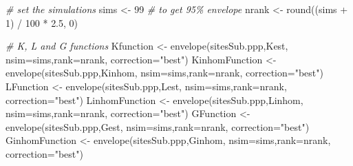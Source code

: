 \documentclass[
]{article}
\newenvironment{Shaded}{\begin{snugshade}}{\end{snugshade}}
\newcommand{\AttributeTok}[1]{\textcolor[rgb]{0.77,0.63,0.00}{#1}}
\newcommand{\CommentTok}[1]{\textcolor[rgb]{0.56,0.35,0.01}{\textit{#1}}}
\newcommand{\DecValTok}[1]{\textcolor[rgb]{0.00,0.00,0.81}{#1}}
\newcommand{\FloatTok}[1]{\textcolor[rgb]{0.00,0.00,0.81}{#1}}
\newcommand{\FunctionTok}[1]{\textcolor[rgb]{0.00,0.00,0.00}{#1}}
\newcommand{\NormalTok}[1]{#1}
\newcommand{\OtherTok}[1]{\textcolor[rgb]{0.56,0.35,0.01}{#1}}
\newcommand{\SpecialCharTok}[1]{\textcolor[rgb]{0.00,0.00,0.00}{#1}}
\newcommand{\StringTok}[1]{\textcolor[rgb]{0.31,0.60,0.02}{#1}}
\begin{document}
\begin{Shaded}
\begin{Highlighting}[]
\CommentTok{\# set the simulations}
\NormalTok{sims }\OtherTok{\textless{}{-}} \DecValTok{99}
\CommentTok{\# to get 95\% envelope}
\NormalTok{nrank }\OtherTok{\textless{}{-}} \FunctionTok{round}\NormalTok{((sims }\SpecialCharTok{+} \DecValTok{1}\NormalTok{) }\SpecialCharTok{/} \DecValTok{100} \SpecialCharTok{*} \FloatTok{2.5}\NormalTok{, }\DecValTok{0}\NormalTok{) }

\CommentTok{\# K, L and G functions }
\NormalTok{Kfunction }\OtherTok{\textless{}{-}} \FunctionTok{envelope}\NormalTok{(sitesSub.ppp,Kest, }\AttributeTok{nsim=}\NormalTok{sims,}\AttributeTok{rank=}\NormalTok{nrank, }\AttributeTok{correction=}\StringTok{"best"}\NormalTok{) }
\NormalTok{KinhomFunction }\OtherTok{\textless{}{-}} \FunctionTok{envelope}\NormalTok{(sitesSub.ppp,Kinhom, }\AttributeTok{nsim=}\NormalTok{sims,}\AttributeTok{rank=}\NormalTok{nrank, }\AttributeTok{correction=}\StringTok{"best"}\NormalTok{)}
\NormalTok{LFunction }\OtherTok{\textless{}{-}} \FunctionTok{envelope}\NormalTok{(sitesSub.ppp,Lest, }\AttributeTok{nsim=}\NormalTok{sims,}\AttributeTok{rank=}\NormalTok{nrank, }\AttributeTok{correction=}\StringTok{"best"}\NormalTok{)}
\NormalTok{LinhomFunction }\OtherTok{\textless{}{-}} \FunctionTok{envelope}\NormalTok{(sitesSub.ppp,Linhom, }\AttributeTok{nsim=}\NormalTok{sims,}\AttributeTok{rank=}\NormalTok{nrank, }\AttributeTok{correction=}\StringTok{"best"}\NormalTok{)}
\NormalTok{GFunction }\OtherTok{\textless{}{-}} \FunctionTok{envelope}\NormalTok{(sitesSub.ppp,Gest, }\AttributeTok{nsim=}\NormalTok{sims,}\AttributeTok{rank=}\NormalTok{nrank, }\AttributeTok{correction=}\StringTok{"best"}\NormalTok{)}
\NormalTok{GinhomFunction }\OtherTok{\textless{}{-}} \FunctionTok{envelope}\NormalTok{(sitesSub.ppp,Ginhom, }\AttributeTok{nsim=}\NormalTok{sims,}\AttributeTok{rank=}\NormalTok{nrank, }\AttributeTok{correction=}\StringTok{"best"}\NormalTok{)}


\end{Highlighting}
\end{Shaded}
\end{document}
